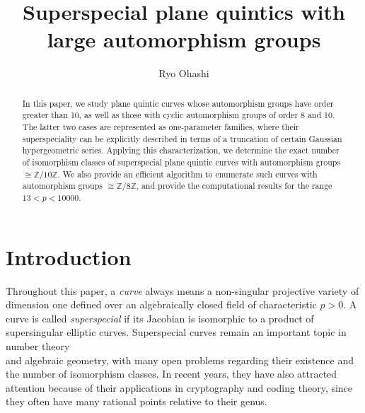 \documentclass{article}
\title{{\bf\textsf{Superspecial plane quintics with large automorphism groups}}}
\author{Ryo Ohashi}
\theoremstyle{definition}
\begin{document}
\maketitle
\begin{abstract}
In this paper, we study plane quintic curves whose automorphism groups have order greater than 10, as well as those with cyclic automorphism groups of order 8 and 10.
The latter two cases are represented as one-parameter families, where their superspeciality can be explicitly described in terms of a truncation of certain Gaussian hypergeometric series.
Applying this characterization, we determine the exact number of isomorphism classes of superspecial plane quintic curves with automorphism groups $\cong \mathbb{Z}/10\mathbb{Z}$.
We also provide an efficient algorithm to enumerate such curves with automorphism groups $\cong \mathbb{Z}/8\mathbb{Z}$, and provide the computational results for the range $13 < p < 10000$.
\end{abstract}

\section{Introduction}
Throughout this paper, a \emph{curve} always means a non-singular projective variety of dimension one defined over an algebraically closed field of characteristic $p > 0$.
A curve is called \emph{superspecial} if its Jacobian is isomorphic to a product of supersingular elliptic curves.
Superspecial curves remain an important topic in number theory\\ and algebraic geometry, with many open problems regarding their existence and the number of isomorphism classes.
In recent years, they have also attracted attention because of their applications in cryptography and coding theory, since they often have many rational points relative to their genus.
\end{document}
